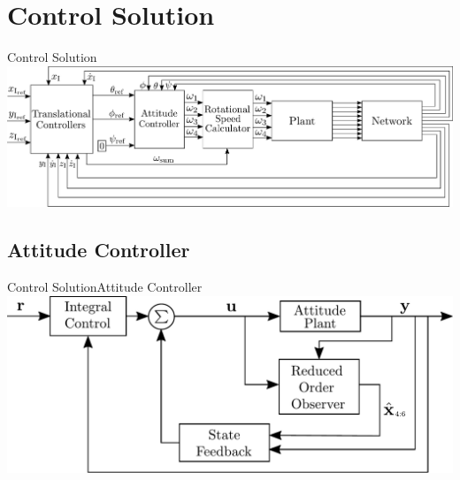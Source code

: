 \section{Control Solution}
\begin{frame}{Control Solution}{}
    \centering
    \includegraphics[scale=0.2]{figures/ControlDiagramPoster}
\end{frame}

\subsection{Attitude Controller}
\begin{frame}{Control Solution}{Attitude Controller}
    \centering
    \includegraphics[scale=0.35]{figures/AttitudeControlDiagram}    
\end{frame}


